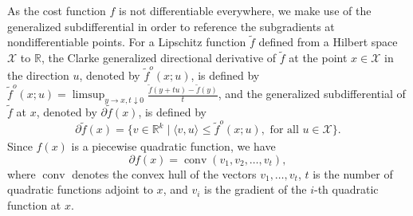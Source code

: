 \documentclass[11pt]{article}
\newcommand{\inner}[3][]{{\langle #2,#3 \rangle_{#1}}} %
\DeclareMathOperator{\conv}{conv}
\begin{document}
As the cost function $f$ is not differentiable everywhere, we make use of the generalized subdifferential in order to reference the subgradients at nondifferentiable points. For a Lipschitz function $\tilde{f}$ defined from a Hilbert space $\mathcal{X}$ to $\mathbb{R}$, the Clarke generalized directional derivative of $\tilde{f}$ at the point $x \in \mathcal{X}$ in the direction $u$, denoted by $\tilde{f}^o(x; u)$, is defined by $\tilde{f}^o(x; u) = \limsup_{y \rightarrow x, t \downarrow 0} \frac{\tilde{f}(y + t u) - \tilde{f}(y)}{t}$, and the generalized subdifferential of $\tilde{f}$ at $x$, denoted by $\partial \tilde{f}(x)$, is defined by
\begin{equation*}
\partial \tilde{f}(x) = \{v \in \mathbb{R}^k \mid \inner[]{v}{u} \leq \tilde{f}^o(x; u), \text{ for all } u \in \mathcal{X}\}.
\end{equation*}
Since $f(x)$ is a piecewise quadratic function, we have
\begin{equation} \label{subdifferential-convex-hull}
\partial f(x) = \conv(v_1, v_2, \ldots, v_t),
\end{equation}
where $\conv$ denotes the convex hull of the vectors $v_1, \ldots, v_t$, $t$ is the number of quadratic functions adjoint to $x$, and $v_i$ is the gradient of the $i$-th quadratic function at $x$. %
\end{document}
